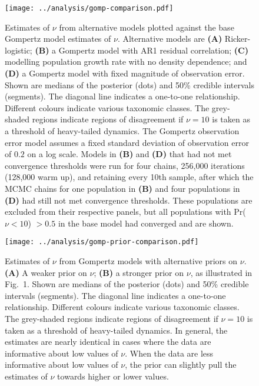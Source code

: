 \documentclass[12pt]{article}
\begin{document}


\renewcommand{\figurename}{Figure}

\begin{figure}[htbp]
\begin{center}
\texttt{[image: ../analysis/gomp-comparison.pdf]}

\caption{Estimates of $\nu$ from alternative models plotted against the
    base Gompertz model estimates of $\nu$. Alternative models are \textbf{(A)}
    Ricker-logistic; \textbf{(B)} a Gompertz model with AR1 residual correlation;
    \textbf{(C)} modelling population growth rate with no density dependence; and
    \textbf{(D)} a Gompertz model with fixed magnitude of observation error. Shown
are medians of the posterior (dots) and 50\% credible intervals (segments). The
diagonal line indicates a one-to-one relationship. Different colours indicate
various taxonomic classes. The grey-shaded regions indicate regions of
disagreement if $\nu = 10$ is taken as a threshold of heavy-tailed dynamics.
The Gompertz observation error model assumes a fixed standard deviation of
observation error of $0.2$ on a log scale. Models in \textbf{(B)} and \textbf{(D)}
that had not met convergence thresholds were run for four chains, 256,000 iterations (128,000 warm up), and retaining every 10th sample, after which the MCMC chains for one population in \textbf{(B)} and four populations in \textbf{(D)} had still not met convergence thresholds. These populations are excluded from their respective panels, but all populations with Pr($\nu < 10$) $> 0.5$ in the base model had converged and are shown.}

\label{fig:alt}
\end{center}
\end{figure}

\clearpage

\begin{figure}[htbp]
\begin{center}
\texttt{[image: ../analysis/gomp-prior-comparison.pdf]}

\caption{Estimates of $\nu$ from Gompertz models with alternative priors on $\nu$. \textbf{(A)} A weaker prior on $\nu$; \textbf{(B)} a stronger prior on $\nu$, as illustrated in Fig.~1. Shown are medians of the posterior (dots) and 50\% credible intervals (segments). The diagonal line indicates a one-to-one relationship. Different colours indicate various taxonomic classes. The grey-shaded regions indicate regions of disagreement if $\nu = 10$ is taken as a threshold of heavy-tailed dynamics. In general, the estimates are nearly identical in cases where the data are informative about low values of $\nu$. When the data are less informative about low values of $\nu$, the prior can slightly pull the estimates of $\nu$ towards higher or lower values.}

\label{fig:alt-priors}
\end{center}
\end{figure}
\end{document}
